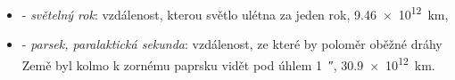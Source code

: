 \begin{itemize}
\begin{itemize}
          \item Velikost viditelného vesmíru je asi \SI{8.66e14}{\AU}.
        \end{itemize}
      \item \textbf{\si{\lightyear}} - \emph{světelný rok}: vzdálenost, kterou světlo ulétna za    
            jeden rok, \SI{9.46e12}{\km},
      \item \textbf{\si{\parsec}} - \emph{parsek, paralaktická sekunda}: vzdálenost, ze které by  
            poloměr oběžné dráhy Země byl kolmo k zornému paprsku vidět pod úhlem 
            \SI{1}{\arcsecond}, 
            \SI{30.9e12}{\km}. 
    \end{itemize}
    


